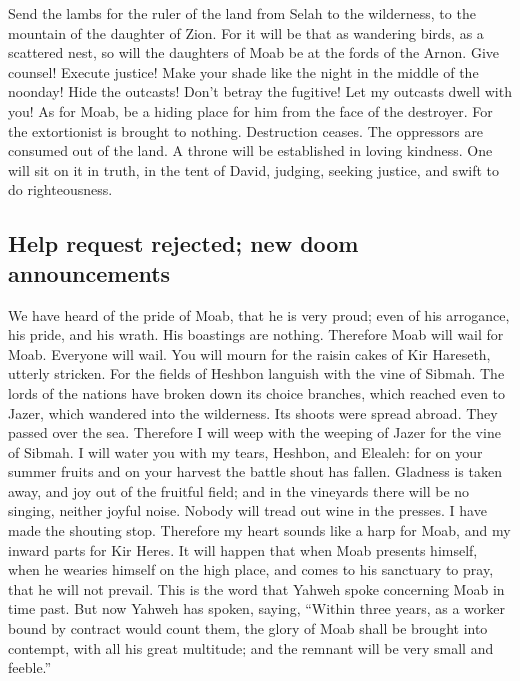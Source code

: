  Send the lambs for the ruler of the land from Selah to
the wilderness, to the mountain of the daughter of Zion. 
For it will be that as wandering birds, as a scattered nest, so will the
daughters of Moab be at the fords of the Arnon.  Give
counsel! Execute justice! Make your shade like the night in the middle
of the noonday! Hide the outcasts! Don't betray the fugitive!
 Let my outcasts dwell with you! As for Moab, be a hiding
place for him from the face of the destroyer. For the extortionist is
brought to nothing. Destruction ceases. The oppressors are consumed out
of the land.  A throne will be established in loving
kindness. One will sit on it in truth, in the tent of David, judging,
seeking justice, and swift to do righteousness.

\hypertarget{help-request-rejected-new-doom-announcements}{%
\subsection{Help request rejected; new doom
announcements}\label{help-request-rejected-new-doom-announcements}}

 We have heard of the pride of Moab, that he is very
proud; even of his arrogance, his pride, and his wrath. His boastings
are nothing.  Therefore Moab will wail for Moab. Everyone
will wail. You will mourn for the raisin cakes of Kir Hareseth, utterly
stricken.  For the fields of Heshbon languish with the
vine of Sibmah. The lords of the nations have broken down its choice
branches, which reached even to Jazer, which wandered into the
wilderness. Its shoots were spread abroad. They passed over the sea.
 Therefore I will weep with the weeping of Jazer for the
vine of Sibmah. I will water you with my tears, Heshbon, and Elealeh:
for on your summer fruits and on your harvest the battle shout has
fallen.  Gladness is taken away, and joy out of the
fruitful field; and in the vineyards there will be no singing, neither
joyful noise. Nobody will tread out wine in the presses. I have made the
shouting stop.  Therefore my heart sounds like a harp for
Moab, and my inward parts for Kir Heres.  It will happen
that when Moab presents himself, when he wearies himself on the high
place, and comes to his sanctuary to pray, that he will not prevail.
 This is the word that Yahweh spoke concerning Moab in
time past.  But now Yahweh has spoken, saying, ``Within
three years, as a worker bound by contract would count them, the glory
of Moab shall be brought into contempt, with all his great multitude;
and the remnant will be very small and feeble.''

